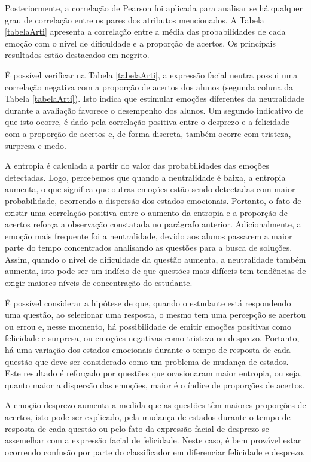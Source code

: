 Posteriormente, a correlação de Pearson foi aplicada para analisar se há qualquer grau de correlação entre os pares dos atributos mencionados. A Tabela \ref{tabelaArti} apresenta a correlação entre a média das probabilidades de cada emoção com o nível de dificuldade e a proporção de acertos. Os principais resultados estão destacados em negrito.

É possível verificar na Tabela \ref{tabelaArti}, a expressão facial neutra possui uma correlação negativa com a proporção de acertos dos alunos (segunda coluna da Tabela \ref{tabelaArti}). Isto indica que estimular emoções diferentes da neutralidade durante a avaliação favorece o desempenho dos alunos. Um segundo indicativo de que isto ocorre, é dado pela correlação positiva entre o desprezo e a felicidade com a proporção de acertos e, de forma discreta, também ocorre com tristeza, surpresa e medo.

A entropia é calculada a partir do valor das probabilidades das emoções detectadas. Logo, percebemos que quando a neutralidade é baixa, a entropia aumenta, o que significa que outras emoções estão sendo detectadas com maior probabilidade, ocorrendo a dispersão dos estados emocionais. Portanto, o fato de existir uma correlação positiva entre o aumento da entropia e a proporção de acertos reforça a observação constatada no parágrafo anterior. Adicionalmente, a emoção mais frequente foi a neutralidade, devido aos alunos passarem a maior parte do tempo concentrados analisando as questões para a busca de soluções. Assim, quando o nível de dificuldade da questão aumenta, a neutralidade também aumenta, isto pode ser um indício de que questões mais difíceis tem tendências de exigir maiores níveis de concentração do estudante.

É possível considerar a hipótese de que, quando o estudante está respondendo uma questão, ao selecionar uma resposta, o mesmo tem uma percepção se acertou ou errou e, nesse momento, há possibilidade de emitir emoções positivas como felicidade e surpresa, ou emoções negativas como tristeza ou desprezo. Portanto, há uma variação dos estados emocionais durante o tempo de resposta de cada questão que deve ser considerado como um problema de mudança de estados. Este resultado é reforçado por
questões que ocasionaram maior entropia, ou seja, quanto maior a dispersão das emoções, maior é o índice de proporções de acertos.

A emoção desprezo aumenta a medida que as questões têm maiores proporções de acertos, isto pode ser explicado, pela mudança de estados durante o tempo de resposta de cada questão ou pelo fato da expressão facial de desprezo se assemelhar com a expressão facial de felicidade. Neste caso, é bem provável estar ocorrendo confusão por parte do classificador em diferenciar felicidade e desprezo.

